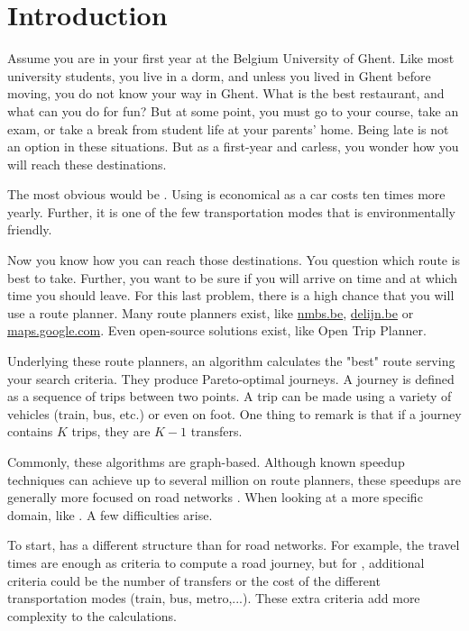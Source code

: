 \chapter{Introduction}
\label{chap:intro}
Assume you are in your first year at the Belgium University of Ghent. Like most university students, you live in a dorm, and unless you lived in Ghent before moving, you do not know your way in Ghent. What is the best restaurant, and what can you do for fun? But at some point, you must go to your course, take an exam, or take a break from student life at your parents' home. Being late is not an option in these situations. But as a first-year and carless, you wonder how you will reach these destinations.  

The most obvious would be . Using  is economical as a car costs ten times more yearly. Further, it is one of the few transportation modes that is environmentally friendly.

Now you know how you can reach those destinations. You question which route is best to take. Further, you want to be sure if you will arrive on time and at which time you should leave. 
For this last problem, there is a high chance that you will use a route planner. Many route planners exist, like \url{nmbs.be}, \url{delijn.be} or \url{maps.google.com}. Even open-source solutions exist, like Open Trip Planner\cite{noauthor_otp_2023}.

Underlying these route planners, an algorithm calculates the "best" route serving your search criteria. They produce Pareto-optimal journeys. A journey is defined as a sequence of trips between two points. A trip can be made using a variety of vehicles (train, bus, etc.) or even on foot. One thing to remark is that if a journey contains $K$ trips, they are $K-1$ transfers. 

Commonly, these algorithms are graph-based. Although known speedup techniques can achieve up to several million on route planners, these speedups are generally more focused on road networks \cite{bast_car_2009}. When looking at a more specific domain, like . A few difficulties arise.

To start,  has a different structure than for road networks. For example, the travel times are enough as criteria to compute a road journey, but for , additional criteria could be the number of transfers or the cost of the different transportation modes (train, bus, metro,...). These extra criteria add more complexity to the calculations.

